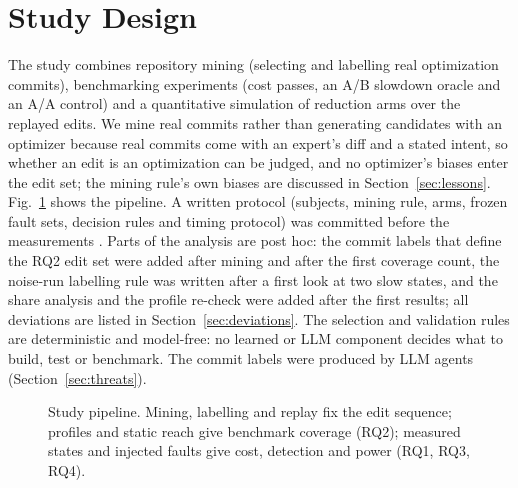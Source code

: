\section{Study Design}
\label{sec:design}

The study combines repository mining (selecting and labelling real optimization commits), benchmarking experiments (cost passes, an A/B slowdown oracle and an A/A control) and a quantitative simulation of reduction arms over the replayed edits.
We mine real commits rather than generating candidates with an optimizer because real commits come with an expert's diff and a stated intent, so whether an edit is an optimization can be judged, and no optimizer's biases enter the edit set; the mining rule's own biases are discussed in Section~\ref{sec:lessons}.
Fig.~\ref{fig:pipeline} shows the pipeline.
A written protocol (subjects, mining rule, arms, frozen fault sets, decision rules and timing protocol) was committed before the measurements .
Parts of the analysis are post hoc: the commit labels that define the RQ2 edit set were added after mining and after the first coverage count, the noise-run labelling rule was written after a first look at two slow states, and the share analysis and the profile re-check were added after the first results; all deviations are listed in Section~\ref{sec:deviations}.
The selection and validation rules are deterministic and model-free: no learned or LLM component decides what to build, test or benchmark. The commit labels were produced by LLM agents (Section~\ref{sec:threats}).

\begin{figure}[t]
\centering
{}
\caption{Study pipeline. Mining, labelling and replay fix the edit sequence; profiles and static reach give benchmark coverage (RQ2); measured states and injected faults give cost, detection and power (RQ1, RQ3, RQ4).}
\label{fig:pipeline}
\end{figure}


